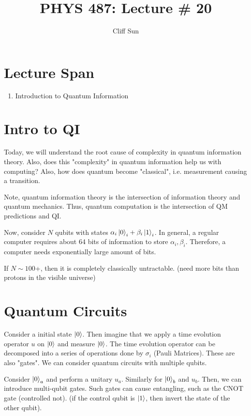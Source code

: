 \documentclass{article}
\title{PHYS 487: Lecture \# 20}
\author{Cliff Sun}
\newtheorem{one minute paper}[theorem]{One Minute Paper}
\begin{document}
\maketitle

\section*{Lecture Span}
\begin{enumerate}
    \item Introduction to Quantum Information
\end{enumerate}

\section*{Intro to QI}

Today, we will understand the root cause of complexity in quantum information theory. Also, does this "complexity" in quantum information help us with computing? 
Also, how does quantum become "classical", i.e. measurement causing a transition. 

Note, quantum information theory is the intersection of information theory and quantum mechanics. Thus, quantum computation is the intersection of QM predictions and QI. 

Now, consider $N$ qubits with states $\alpha_i\ket{0}_i + \beta_i\ket{1}_i$. In general, a regular computer requires about 64 bits of information to store $\alpha_i, \beta_i$. Therefore, 
a computer needs exponentially large amount of bits.

If $N \sim 100$+, then it is completely classically untractable. (need more bits than protons in the visible universe) 

\section*{Quantum Circuits}

Consider a initial state $\ket{0}$. Then imagine that we apply a time evolution operator $u$ on $\ket{0}$ and measure $\ket{0}$. The time evolution operator can be decomposed into a series of operations done by 
$\sigma_i$ (Pauli Matrices). These are also "gates". We can consider quantum circuits with multiple qubits.

Consider $\ket{0}_a$ and perform a unitary $u_a$. Similarly for $\ket{0}_b$ and $u_b$. Then, we can introduce multi-qubit gates. Such gates can cause entangling, such as the CNOT gate (controlled not). (if the control qubit is $\ket{1}$, then invert the state of the other qubit). 
\end{document}

